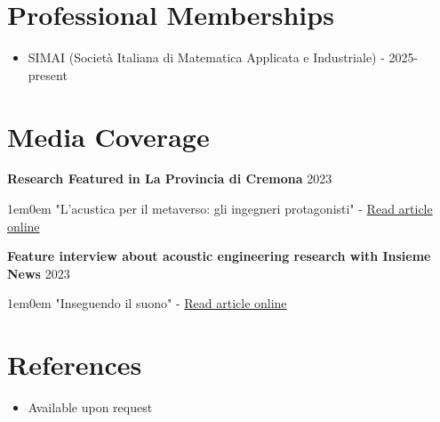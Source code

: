 \documentclass[11pt,a4paper]{article}
\newcommand{\cvdetail}[1]{%
  \begin{adjustwidth}{1em}{0em}
    #1
  \end{adjustwidth}%
  \vspace{0.5em}%
}
\newcommand{\cvsubitem}[2]{%
  \vspace{0.3em}%
  \noindent\textbf{#1} \hfill #2%
  \vspace{0.2em}%
}
\begin{document}
\section{Professional Memberships}

\begin{itemize}
  \item SIMAI (Società Italiana di Matematica Applicata e Industriale) - 2025-present
\end{itemize}

\section{Media Coverage}

\cvsubitem{Research Featured in La Provincia di Cremona}{2023}
\cvdetail{"L'acustica per il metaverso: gli ingegneri protagonisti" - \href{https://www.laprovinciacr.it/news/cronaca/418996/lacustica-per-il-metaverso-gli-ingegneri-protagonisti.html}{Read article online}}
\cvsubitem{Feature interview about acoustic engineering research with Insieme News}{2023}
\cvdetail{"Inseguendo il suono" - \href{https://www.insiemenews.it/2023/10/23/inseguendo-il-suono/}{Read article online}}

\section{References}

\begin{itemize}
  \item Available upon request
\end{itemize}
\end{document}
